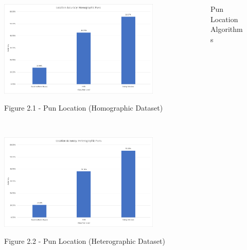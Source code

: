 \documentclass[final]{beamer}
\newlength{\onecolwid}
\newlength{\twocolwid}
\begin{document}
\begin{frame}[t]
\begin{columns}[t]
\begin{column}{\twocolwid}
\begin{columns}[t,totalwidth=\twocolwid]
\begin{column}{\onecolwid}
					\vspace{25mm}
					\begin{figure}
					\includegraphics[width=0.85\textwidth]{HomographicLocation.png}\\
					\caption{Figure 2.1 - Pun Location (Homographic Dataset)}
					\end{figure}
					\\
					\vspace{20mm}
					\begin{figure}
					\includegraphics[width=0.85\textwidth]{HeterographicLocation.png}\\
					\caption{Figure 2.2 - Pun Location (Heterographic Dataset)}
					\end{figure}
				\end{column}
				\begin{column}{\onecolwid}
					\vspace{55mm}
					\begin{block}{Pun Location Algorithms}
						{\large 
							\begin{itemize}

\end{itemize}}
\end{block}
\end{column}
\end{columns}
\end{column}
\end{columns}
\end{frame}
\end{document}
